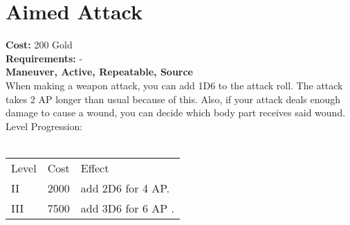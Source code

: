 \section{Aimed Attack}
\textbf{Cost:} 200 Gold\\
\textbf{Requirements:} -\\
\textbf{Maneuver, Active, Repeatable, Source}\\
When making a weapon attack, you can add 1D6 to the attack roll. The attack takes 2 AP longer than usual because of this. Also, if your attack deals enough damage to cause a wound, you can decide which body part receives said wound.
\\
Level Progression:\\
\\
\begin{tabular}{l | l | l}
	Level & Cost & Effect\\
	II & 2000 & add 2D6 for 4 AP.\\
	III & 7500 & add 3D6 for 6 AP .\\
\end{tabular}